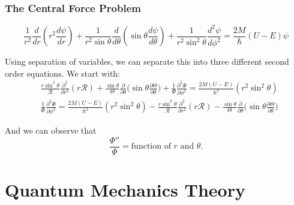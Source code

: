 \documentclass[11pt,fleqn]{book} %
\begin{document}
\section{The Central Force Problem}
\begin{theorem}
    $$\frac{1}{r^2}\frac{d}{dr}\left(r^2\frac{d\psi}{dr}\right) + \frac{1}{r^2\sin\theta}\frac{d}{d\theta}\left(\sin\theta\frac{d\psi}{d\theta}\right) + \frac{1}{r^2\sin^2\theta}\frac{d^2\psi}{d\phi^2}=\frac{2M}{\hslash}(U-E)\psi$$
\end{theorem}
Using separation of variables, we can separate this into three different second order equations. We start with:
\begin{align*}
&\frac{r\sin^2\theta}{\mathcal{R}}\frac{\partial^2}{\partial r^2}(r\mathcal{R}) + \frac{\sin\theta}{\Theta}\frac{\partial}{\partial\theta}\bigg(\sin\theta\frac{\partial\Theta}{\partial\theta}\bigg)+\frac{1}{\Phi}\frac{\partial^2\Phi}{\partial\phi^2} = \frac{2M(U-E)}{\hslash^2}(r^2\sin^2\theta)\\
&\frac{1}{\Phi}\frac{\partial^2\Phi}{\partial\phi^2} = \frac{2M(U-E)}{\hslash^2}(r^2\sin^2\theta)-\frac{r\sin^2\theta}{\mathcal{R}}\frac{\partial^2}{\partial r^2}(r\mathcal{R})-\frac{\sin\theta}{\Theta}\frac{\partial}{\partial\theta}\bigg(\sin\theta\frac{\partial\Theta}{\partial\theta}\bigg)
\end{align*}

And we can observe that 
$$\frac{\Phi''}{\Phi} = \text{function of $r$ and $\theta$}.$$

\part{Quantum Mechanics Theory}














\end{document}
